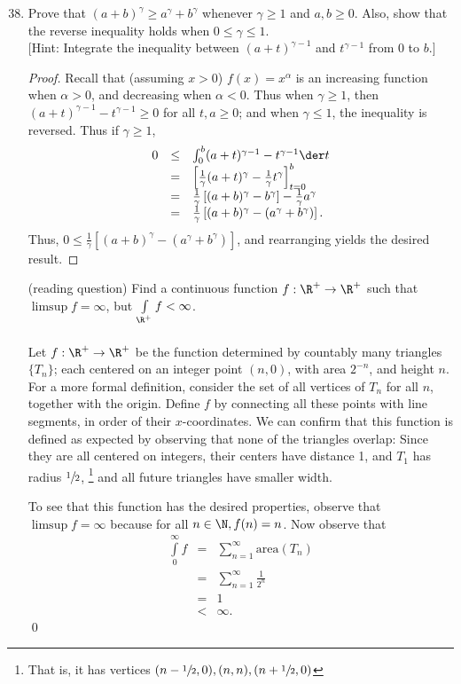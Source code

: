 \documentclass[letterpaper]{article}
\begin{document}
\begin{enumerate}
\setcounter{enumi}{37}
\item Prove that $(a+b)^\gamma\geq a^\gamma + b^\gamma$ whenever $\gamma\geq 1$ and $a, b \geq 0$. Also, show that the reverse inequality holds when $0 \leq \gamma \leq 1$. \\
$[$Hint: Integrate the inequality between $(a+t)^{\gamma-1}$ and $t^{\gamma-1}$ from 0 to $b.]$
\begin{proof}
Recall that (assuming $x > 0$) $f(x)=x^\alpha$ is an increasing function when $\alpha>0$, and decreasing when $\alpha<0$. Thus when $\gamma\geq1$, then $(a+t)^{\gamma-1}-t^{\gamma-1} \geq 0$ for all $t,a\geq0$; and when $\gamma\leq1$, the inequality is reversed. Thus if $\gamma\geq1$,
\[\begin{array}{rcl}
0&\leq& \int_0^b (a+t)^{\gamma-1}-t^{\gamma-1} \der t\\
&=&\left[\frac{1}{\gamma}(a+t)^\gamma - \frac{1}{\gamma}t^\gamma\right]_{t=0}^b\\
&=&\frac{1}{\gamma}\left[(a+b)^\gamma-b^\gamma\right]-\frac{1}{\gamma}a^\gamma\\
&=&\frac{1}{\gamma}	\left[(a+b)^\gamma-(a^\gamma+b^\gamma)\right].
\end{array}\]
Thus, $0\leq\frac{1}{\gamma}	\left[(a+b)^\gamma-(a^\gamma+b^\gamma)\right]$, and rearranging yields the desired result.
\end{proof}


\item[(reading question)] Find a continuous function $f:\R^+\to\R^+$ such that $\limsup f = \infty$, but $\int\limits_{\R^+} f < \infty$. \\
\mbox{}\\
\answer Let $f:\R^+\to\R^+$ be the function determined by countably many triangles $\{T_n\}$; each centered on an integer point $(n,0)$, with area $2^{-n}$, and height $n$.
For a more formal definition, consider the set of all vertices of $T_n$ for all $n$, together with the origin. Define $f$ by connecting all these points with line segments, in order of their $x$-coordinates. We can confirm that this function is defined as expected by observing that none of the triangles overlap: Since they are all centered on integers, their centers have distance 1, and $T_1$ has radius $\sfrac{1}{2}$, \footnote{That is, it has vertices $(n-\sfrac{1}{2}, 0), (n,n), (n+\sfrac{1}{2}, 0)$} and all future triangles have smaller width.

To see that this function has the desired properties, observe that $\limsup f = \infty$ because for all $n\in\N, f(n)=n$. Now observe that
\[\begin{array}{rcl}
\int\limits_0^\infty f &=& \sum\limits_{n=1}^\infty \text{area}(T_n)\\
&=& \sum\limits_{n=1}^\infty \frac{1}{2^n}\\
&=& 1\\
&<& \infty.
\end{array}
\]
\qed
\end{enumerate}
\end{document}
